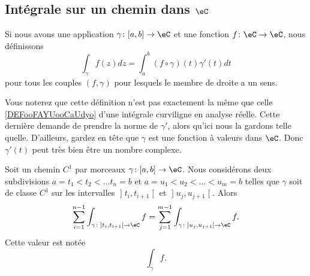 \subsection{Intégrale sur un chemin dans \( \eC\)}

\begin{definition}      \label{DEFooBPLJooZwsmxi}
	Si nous avons une application \( \gamma\colon \mathopen[ a , b \mathclose]\to \eC\) et une fonction \( f\colon \eC\to \eC\), nous définissons
	\begin{equation}
		\int_{\gamma}f(z)dz=\int_a^b(f\circ \gamma)(t)\gamma'(t)dt
	\end{equation}
	pour tous les couples \( (f,\gamma)\) pour lesquels le membre de droite a un sens.
\end{definition}

\begin{normaltext}
	Vous noterez que cette définition n'est pas exactement la même que celle \ref{DEFooFAYUooCaUdyo} d'une intégrale curviligne en analyse réelle. Cette dernière demande de prendre la norme de \( \gamma'\), alors qu'ici nous la gardons telle quelle. D'ailleurs, gardez en tête que \( \gamma\) est une fonction à valeurs dans \( \eC\). Donc \( \gamma'(t)\) peut très bien être un nombre complexe.
\end{normaltext}

\begin{propositionDef}       \label{PROPooCUBTooZDcdHX}
	Soit un chemin \( C^1\) par morceaux \( \gamma\colon \mathopen[ a , b \mathclose]\to \eC\). Nous considérons deux subdivisions \( a=t_1<t_2<\ldots t_n=b\) et \( a=u_1<u_2<\ldots <u_m=b\) telles que \( \gamma\) soit de classe \( C^1\) sur les intervalles \( \mathopen] t_i , t_{i+1} \mathclose[\) et \( \mathopen] u_j , u_{j+1} \mathclose[\). Alors
	\begin{equation}
		\sum_{i=1}^{n-1}\int_{\gamma\colon \mathopen] t_i , t_{i+1} \mathclose[\to \eC}f= \sum_{j=1}^{m-1}\int_{\gamma\colon \mathopen] u_j , u_{j+1} \mathclose[\to \eC}f.
	\end{equation}
	Cette valeur est notée
	\begin{equation}
		\int_{\gamma}f.
	\end{equation}
\end{propositionDef}

